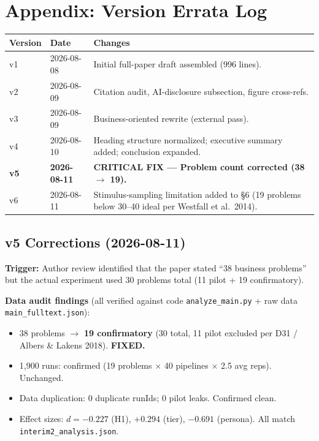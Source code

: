 \documentclass[12pt,a4paper]{article}
\begin{document}
\clearpage
\section*{Appendix: Version Errata Log}

\begin{table}[h]
\centering
\small
\begin{tabular}{llp{9cm}}
\toprule
Version & Date & Changes \\
\midrule
v1 & 2026-08-08 & Initial full-paper draft assembled (996 lines). \\
v2 & 2026-08-09 & Citation audit, AI-disclosure subsection, figure cross-refs. \\
v3 & 2026-08-09 & Business-oriented rewrite (external pass). \\
v4 & 2026-08-10 & Heading structure normalized; executive summary added; conclusion expanded. \\
\textbf{v5} & \textbf{2026-08-11} & \textbf{CRITICAL FIX --- Problem count corrected (38 $\to$ 19).} \\
v6 & 2026-08-11 & Stimulus-sampling limitation added to \S 6 (19 problems below 30--40 ideal per Westfall et al.\ 2014). \\
\bottomrule
\end{tabular}
\end{table}

\subsection*{v5 Corrections (2026-08-11)}

\textbf{Trigger:} Author review identified that the paper stated ``38 business problems''
but the actual experiment used 30 problems total (11 pilot + 19 confirmatory).

\textbf{Data audit findings} (all verified against code \texttt{analyze\_main.py} + raw data
\texttt{main\_fulltext.json}):
\begin{itemize}
  \item 38 problems $\to$ \textbf{19 confirmatory} (30 total, 11 pilot excluded per D31 / Albers \& Lakens 2018). \textbf{FIXED.}
  \item 1,900 runs: confirmed (19 problems $\times$ 40 pipelines $\times$ 2.5 avg reps). Unchanged.
  \item Data duplication: 0 duplicate runIds; 0 pilot leaks. Confirmed clean.
  \item Effect sizes: $d = -0.227$ (H1), $+0.294$ (tier), $-0.691$ (persona). All match \texttt{interim2\_analysis.json}.
\end{itemize}
\end{document}
